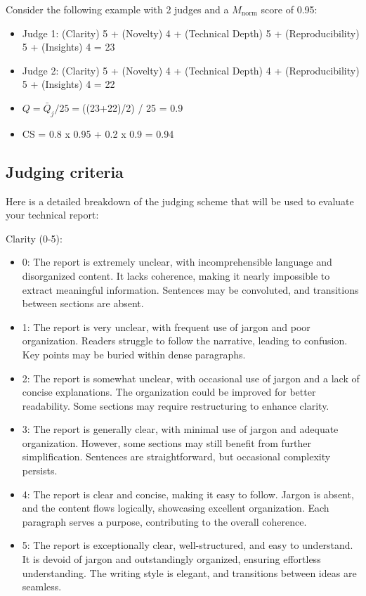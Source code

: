 \documentclass[11pt,a4paper]{storm-ai_report}
\begin{document}
Consider the following example with 2 judges and a $M_{\text{norm}}$ score of 0.95:
\begin{itemize}
    \item Judge 1: (Clarity) 5 + (Novelty) 4 + (Technical Depth) 5 + (Reproducibility) 5 + (Insights) 4 = 23
    \item Judge 2: (Clarity) 5 + (Novelty) 4 + (Technical Depth) 4 + (Reproducibility) 5 + (Insights) 4 = 22
    \item $Q = \bar Q_{j}/25 = $((23+22)/2) / 25 = 0.9
    \item CS = 0.8 x 0.95 + 0.2 x 0.9 = 0.94
\end{itemize}

\subsection{Judging criteria}
Here is a detailed breakdown of the judging scheme that will be used to evaluate your technical report:

Clarity (0-5):
\begin{itemize}
    \item  0: The report is extremely unclear, with incomprehensible language and disorganized content. It lacks coherence, making it nearly impossible to extract meaningful information. Sentences may be convoluted, and transitions between sections are absent.
    \item 1: The report is very unclear, with frequent use of jargon and poor organization. Readers struggle to follow the narrative, leading to confusion. Key points may be buried within dense paragraphs.
    \item 2: The report is somewhat unclear, with occasional use of jargon and a lack of concise explanations. The organization could be improved for better readability. Some sections may require restructuring to enhance clarity.
    \item 3: The report is generally clear, with minimal use of jargon and adequate organization. However, some sections may still benefit from further simplification. Sentences are straightforward, but occasional complexity persists.
    \item 4: The report is clear and concise, making it easy to follow. Jargon is absent, and the content flows logically, showcasing excellent organization. Each paragraph serves a purpose, contributing to the overall coherence.
    \item 5: The report is exceptionally clear, well-structured, and easy to understand. It is devoid of jargon and outstandingly organized, ensuring effortless understanding. The writing style is elegant, and transitions between ideas are seamless.
\end{itemize}
\end{document}
